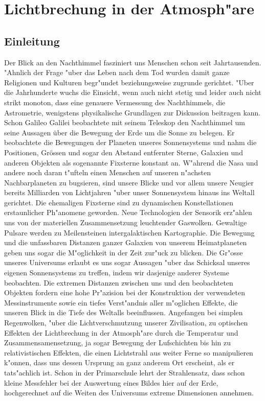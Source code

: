 \chapter{Lichtbrechung in der Atmosph"are\label{chapter:licht}}
\begin{refsection}


\section{Einleitung}

Der Blick an den Nachthimmel fasziniert uns Menschen schon seit Jahrtausenden. "Ahnlich der Frage "uber das Leben nach dem Tod wurden damit ganze Religionen und Kulturen begr"undet beziehungsweise zugrunde gerichtet. 
"Uber die Jahrhunderte wuchs die Einsicht, wenn auch nicht stetig und leider auch nicht strikt monoton, dass eine genauere Vermessung des Nachthimmels, die Astrometrie, wenigstens physikalische Grundlagen zur Diskussion beitragen kann. 
Schon Galileo Galilei beobachtete mit seinem Teleskop den Nachthimmel um seine Aussagen über die Bewegung der Erde um die Sonne zu belegen.
Er beobachtete die Bewegungen der Planeten unseres Sonnensystems und nahm die Positionen, Grössen und sogar den Abstand entfernter Sterne, Galaxien und anderen Objekten als sogenannte Fixsterne konstant an. 
W"ahrend die Nasa und andere noch daran t"ufteln einen Menschen auf unseren n"achsten Nachbarplaneten zu bugsieren, sind unsere Blicke und vor allem unsere Neugier bereits Milliarden von Lichtjahren "uber unser Sonnensystem hinaus ins Weltall gerichtet. 
Die ehemaligen Fixsterne sind zu dynamischen Konstellationen erstaunlicher Ph"anomene geworden.
Neue Technologien der Sensorik erz"ahlen uns von der materiellen Zusammensetzung leuchtender Gaswolken. 
Gewaltige Pulsare werden zu Meilensteinen intergalaktischen Kartographie. 
Die Bewegung und die unfassbaren Distanzen ganzer Galaxien von unserem Heimatplaneten geben uns sogar die M"oglichkeit in der Zeit zur"uck zu blicken.
Die Gr"osse unseres Universums  erlaubt es uns sogar Aussagen "uber das Schicksal unseres eigenen Sonnensystems zu treffen, indem wir dasjenige anderer Systeme beobachten. 
Die extremen Distanzen zwischen uns und den beobachteten Objekten fordern eine hohe Pr"azision bei der Konstruktion der verwendeten Messinstrumente sowie ein tiefes Verst"andnis aller m"oglichen Effekte, die unseren Blick in die Tiefe des Weltalls beeinflussen. 
Angefangen bei simplen Regenwolken, "uber die Lichtverschmutzung unserer Zivilisation, zu optischen Effekten der Lichtbrechung in der Atmosph"are durch die Temperatur und Zusammensamensetzung, ja sogar Bewegung der Lufschichten bis hin zu relativistischen Effekten, die einen Lichtstrahl aus weiter Ferne so manipulieren k"onnen, dass uns dessen Ursprung an ganz anderem Ort erscheint, als er tats"achlich ist. 
Schon in der Primarschule lehrt der Strahlensatz, dass schon kleine Messfehler bei der Auswertung eines Bildes hier auf der Erde, hochgerechnet auf die Weiten des Universums extreme Dimensionen annehmen.
 

\end{refsection}
